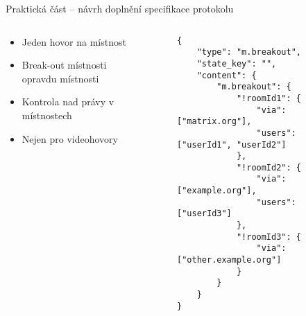 \documentclass[aspectratio=169]{beamer}
\begin{document}
\begin{frame}[fragile]{Praktická část -- návrh doplnění specifikace protokolu}
    \pause
    \begin{columns}
        \begin{column}{0.5\textwidth}
            \begin{itemize}[<+->]
                \pause
                \item Jeden hovor na místnost
                \item Break-out místnosti opravdu místnosti
                \item Kontrola nad právy v místnostech
                \item Nejen pro videohovory
            \end{itemize}
        \end{column}
        \begin{column}{0.5\textwidth}
             \begin{figure}
                \begin{verbatim}
{
	"type": "m.breakout",
	"state_key": "",
	"content": {
		"m.breakout": {
			"!roomId1": {
				"via": ["matrix.org"],
				"users": ["userId1", "userId2"]
			},
			"!roomId2": {
				"via": ["example.org"],
				"users": ["userId3"]
			},
			"!roomId3": {
				"via": ["other.example.org"]
			}
		}
	}
}
                    \end{verbatim}
            \end{figure}
        \end{column}
    \end{columns}
\end{frame}
\end{document}
